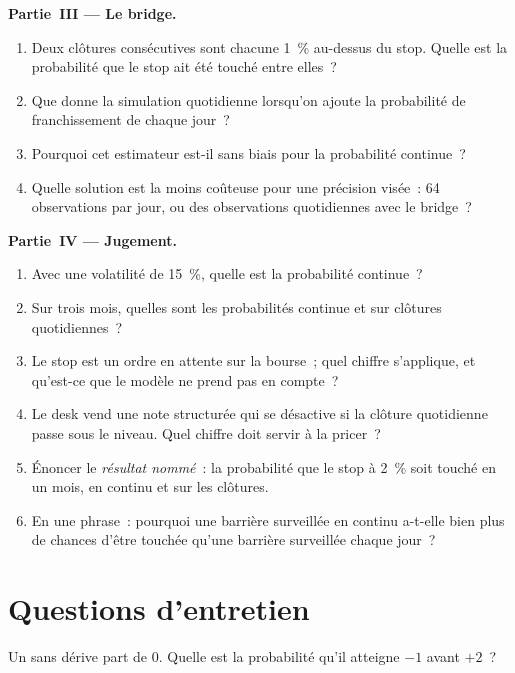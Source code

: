 \begin{problem}
\medskip\noindent\textbf{Partie~III --- Le bridge.}
\begin{enumerate}[resume]
\item Deux clôtures consécutives sont chacune 1~\% au-dessus du stop. Quelle est la probabilité que le stop ait été touché entre elles~?
\item Que donne la simulation quotidienne lorsqu'on ajoute la probabilité de franchissement de chaque jour~?
\item Pourquoi cet estimateur est-il sans biais pour la probabilité continue~?
\item Quelle solution est la moins coûteuse pour une précision visée~: 64 observations par jour, ou des observations quotidiennes avec le bridge~?
\end{enumerate}

\medskip\noindent\textbf{Partie~IV --- Jugement.}
\begin{enumerate}[resume]
\item Avec une volatilité de 15~\%, quelle est la probabilité continue~?
\item Sur trois mois, quelles sont les probabilités continue et sur clôtures quotidiennes~?
\item Le stop est un ordre en attente sur la bourse~; quel chiffre s'applique, et qu'est-ce que le modèle ne prend pas en compte~?
\item Le desk vend une note structurée qui se désactive si la clôture quotidienne passe sous le niveau. Quel chiffre doit servir à la pricer~?
\item Énoncer le \emph{résultat nommé}~: la probabilité que le stop à 2~\% soit touché en un mois, en continu et sur les clôtures.
\item En une phrase~: pourquoi une barrière surveillée en continu a-t-elle bien plus de chances d'être touchée qu'une barrière surveillée chaque jour~?
\end{enumerate}
\end{problem}

\section{Questions d'entretien}

\begin{interviewq}\label{iq:qm:brownian-motion:1}
Un  sans dérive part de 0. Quelle est la probabilité qu'il atteigne $-1$ avant $+2$~?
\end{interviewq}

